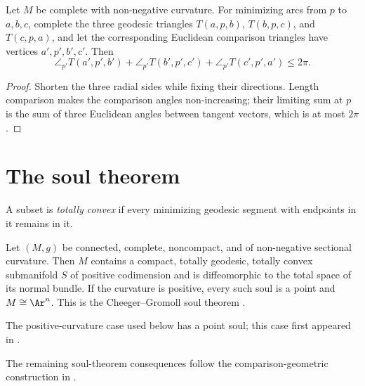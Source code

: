 \begin{corollary}
\label{cor:angle-comparison}
\label{anglecompar}

Let $M$ be complete with non-negative curvature. For minimizing arcs
from $p$ to $a,b,c$, complete the three geodesic triangles
$T(a,p,b)$, $T(b,p,c)$, and $T(c,p,a)$, and let the corresponding
Euclidean comparison triangles have vertices $a',p',b',c'$. Then
$$\angle_{p'}T(a',p',b')+\angle_{p'}T(b',p',c')
+\angle_{p'}T(c',p',a')\le2\pi.$$
\end{corollary}
\begin{proof}
\sketch
{}
Shorten the three radial sides while fixing their directions. Length
comparison makes the comparison angles non-increasing; their limiting
sum at $p$ is the sum of three Euclidean angles between tangent vectors,
which is at most $2\pi$.
\end{proof}

\section{The soul theorem}

A subset is \emph{totally convex} if every minimizing geodesic segment
with endpoints in it remains in it.

\begin{theorem}
\label{thm:soul-theorem}
\label{soul}

Let $(M,g)$ be connected, complete, noncompact, and of non-negative
sectional curvature. Then $M$ contains a compact, totally geodesic,
totally convex submanifold $S$ of positive codimension and is
diffeomorphic to the total space of its normal bundle. If the curvature
is positive, every such soul is a point and $M\cong\Ar^n$.
This is the Cheeger--Gromoll soul theorem
\cite{CheegerGromollbul,CheegerGromoll}.
\end{theorem}

\begin{remark}
\label{rem:soul-theorem-positive-curvature}

The positive-curvature case used below has a point soul; this case first
appeared in \cite{GromollMeyer}.
\end{remark}

The remaining soul-theorem consequences follow the comparison-geometric
construction in \cite{Petersen}.

